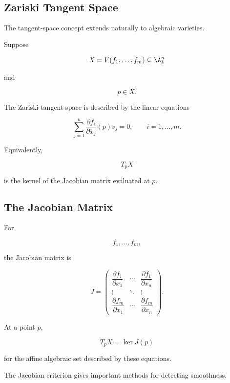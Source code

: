 \subsection{Zariski Tangent Space}
\label{subsec:zariski-tangent-space}

The tangent-space concept extends naturally to algebraic varieties.

Suppose

\[
X=V(f_1,\ldots,f_m)\subseteq\A^n_k
\]

and

\[
p\in X.
\]

The Zariski tangent space is described by the linear equations

\[
\boxed{
\sum_{j=1}^{n}
\frac{\partial f_i}{\partial x_j}(p)v_j=0,
\qquad
i=1,\ldots,m.
}
\]

Equivalently,

\[
T_pX
\]

is the kernel of the Jacobian matrix evaluated at \(p\).

\subsection{The Jacobian Matrix}
\label{subsec:algebraic-jacobian-matrix}

For

\[
f_1,\ldots,f_m,
\]

the Jacobian matrix is

\[
\boxed{
J=
\begin{pmatrix}
\dfrac{\partial f_1}{\partial x_1}
&
\cdots
&
\dfrac{\partial f_1}{\partial x_n}
\\[2mm]
\vdots
&
\ddots
&
\vdots
\\[2mm]
\dfrac{\partial f_m}{\partial x_1}
&
\cdots
&
\dfrac{\partial f_m}{\partial x_n}
\end{pmatrix}.
}
\]

At a point \(p\),

\[
\boxed{
T_pX=\ker J(p)
}
\]

for the affine algebraic set described by these equations.

The Jacobian criterion gives important methods for detecting smoothness.

